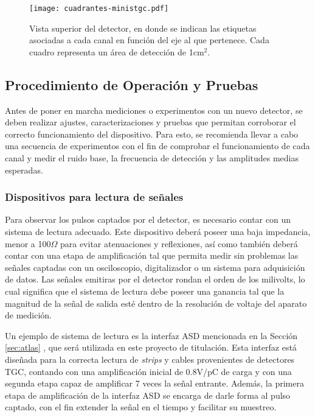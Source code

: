 	\begin{figure}[h]
		\centering
		\texttt{[image: cuadrantes-ministgc.pdf]}
		\caption{Vista superior del detector, en donde se indican las etiquetas asociadas a cada canal en función del eje al que pertenece. Cada cuadro representa un área de detección de 1cm$^2$.}
		\label{img:cuadrantes-ministgc}
	\end{figure}

\subsection{Procedimiento de Operación y Pruebas}
	Antes de poner en marcha mediciones o experimentos con un nuevo detector, se deben realizar ajustes, caracterizaciones y pruebas que permitan corroborar el correcto funcionamiento del dispositivo. Para esto, se recomienda llevar a cabo una secuencia de experimentos con el fin de comprobar el funcionamiento de cada canal y medir el ruido base, la frecuencia de detección y las amplitudes medias esperadas.

	\subsubsection{Dispositivos para lectura de señales}
		Para observar los pulsos captados por el detector, es necesario contar con un sistema de lectura adecuado. Este dispositivo deberá poseer una  baja impedancia, menor a 100$\Omega$ para evitar atenuaciones y reflexiones, así como también deberá contar con una etapa de amplificación tal que permita medir sin problemas las señales captadas con un osciloscopio, digitalizador o un sistema para adquisición de datos. Las señales emitiras por el detector rondan el orden de los milivolts, lo cual significa que el sistema de lectura debe poseer una ganancia tal que la magnitud de la señal de salida esté dentro de la resolución de voltaje del aparato de medición.
		
		Un ejemplo de sistema de lectura es la interfaz ASD mencionada en la Sección \ref{sec:atlas} , que será utilizada en este proyecto de titulación. Esta interfaz está diseñada para la correcta lectura de \textit{strips} y cables provenientes de detectores TGC,  contando con una amplificación inicial de 0.8V/pC de carga y con una segunda etapa capaz de amplificar 7 veces la señal entrante. Además, la primera etapa de amplificación de la interfaz ASD se encarga de darle forma al pulso captado, con el fin extender la señal en el tiempo y facilitar su muestreo.
		
